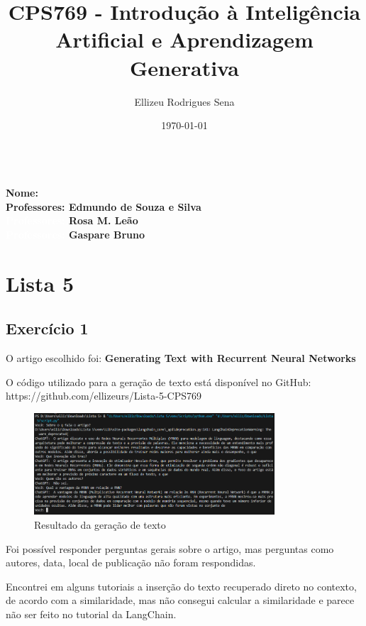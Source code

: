 \documentclass[a4paper,12pt,fleqn]{article}
\title{CPS769 - Introdução à Inteligência Artificial e Aprendizagem Generativa}
\author{Ellizeu Rodrigues Sena}
\date{\today}
\renewcommand{\maketitle}{%
  \noindent\textbf{\thetitle}\\
  \textbf{Nome: \theauthor}\\
  \textbf{Professores: Edmundo de Souza e Silva}\\
  \textbf{\textcolor{white}{Professores:} Rosa M. Leão}\\
  \textbf{\textcolor{white}{Professores:} Gaspare Bruno}\\
}
\begin{document}
  \maketitle

  \section*{Lista 5}

    \subsection*{Exercício 1}
    
    O artigo escolhido foi: \textbf{Generating Text with Recurrent Neural Networks}
    
    O código utilizado para a geração de texto está disponível no GitHub: \\
    https://github.com/ellizeurs/Lista-5-CPS769
    
    \begin{figure}[h]
      \centering
      \includegraphics[width=0.8\textwidth]{assets/resposta.png}
      \caption{Resultado da geração de texto}
    \end{figure}

    Foi possível responder perguntas gerais sobre o artigo, mas perguntas como autores, data, local de publicação não foram respondidas.

    Encontrei em alguns tutoriais a inserção do texto recuperado direto no contexto, de acordo com a similaridade, mas não consegui calcular a similaridade e parece não ser feito no tutorial da LangChain.
\end{document}
